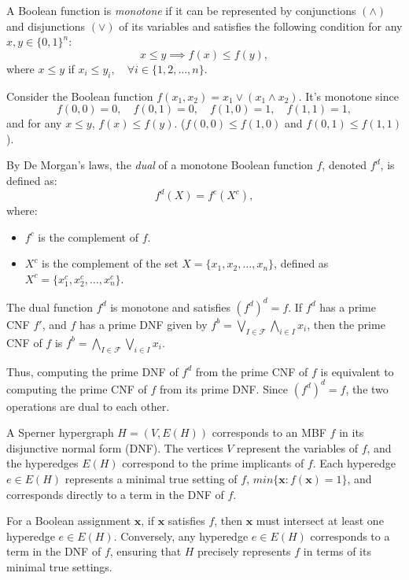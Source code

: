 \begin{definition}
A Boolean function is \emph{monotone} if it can be represented by conjunctions $(\wedge)$ and disjunctions $(\vee)$ of its variables and satisfies the following condition for any $x,y\in\{0,1\}^n$:
\[
x\leq y\implies f(x)\leq f(y),
\]
where $x\leq y$ if $x_i\leq y_i,\quad\forall i\in\{1,2,\dots,n\}$.
\end{definition}

\begin{example}
Consider the Boolean function $f(x_1,x_2)=x_1\vee(x_1\wedge x_2)$. It's monotone since
\[
f(0,0)=0,\quad f(0,1)=0,\quad f(1,0)=1,\quad f(1,1)=1,
\]
and for any $x\leq y$, $f(x)\leq f(y)$. ($f(0,0)\leq f(1,0)$ and $f(0,1)\leq f(1,1)$).
\end{example}

\begin{definition}
By De Morgan's laws, the \emph{dual} of a monotone Boolean function $f$, denoted $f^d$, is defined as:
\[
f^d(X)=f^c(X^c),
\]
where:
\begin{itemize}
\item $f^c$ is the complement of $f$.
\item $X^c$ is the complement of the set $X=\{x_1,x_2,\dots,x_n\}$, defined as $X^c=\{x_1^c,x_2^c,\dots,x_n^c\}$.
\end{itemize}
\end{definition}

The dual function $f^d$ is monotone and satisfies $(f^d)^d=f$. If $f^d$ has a prime CNF $f'$, and $f$ has a prime DNF given by $f^b=\bigvee_{I\in\mathcal{F}}\bigwedge_{i\in I}x_i$, then the prime CNF of $f$ is $f^b=\bigwedge_{I\in\mathcal{F}}\bigvee_{i\in I}x_i$.

Thus, computing the prime DNF of $f^d$ from the prime CNF of $f$ is equivalent to computing the prime CNF of $f$ from its prime DNF. Since $(f^d)^d=f$, the two operations are dual to each other.

A Sperner hypergraph $H=(V,E(H))$ corresponds to an MBF $f$ in its disjunctive normal form (DNF). The vertices $V$ represent the variables of $f$, and the hyperedges $E(H)$ correspond to the prime implicants of $f$. Each hyperedge $e\in E(H)$ represents a minimal true setting of $f$, $min\{\mathbf{x}:f(\mathbf{x})=1\}$, and corresponds directly to a term in the DNF of $f$.

For a Boolean assignment $\mathbf{x}$, if $\mathbf{x}$ satisfies $f$, then $\mathbf{x}$ must intersect at least one hyperedge $e\in E(H)$. Conversely, any hyperedge $e\in E(H)$ corresponds to a term in the DNF of $f$, ensuring that $H$ precisely represents $f$ in terms of its minimal true settings.

